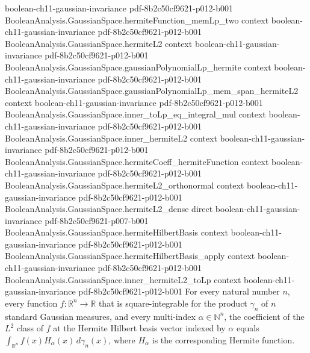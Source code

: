 \begin{lemma}
  {boolean-ch11-gaussian-invariance}
  {pdf-8b2c50cf9621-p012-b001}
\proofstep
  {BooleanAnalysis.GaussianSpace.hermiteFunction_memLp_two}
  {context}
  {boolean-ch11-gaussian-invariance}
  {pdf-8b2c50cf9621-p012-b001}
\proofstep
  {BooleanAnalysis.GaussianSpace.hermiteL2}
  {context}
  {boolean-ch11-gaussian-invariance}
  {pdf-8b2c50cf9621-p012-b001}
\proofstep
  {BooleanAnalysis.GaussianSpace.gaussianPolynomialLp_hermite}
  {context}
  {boolean-ch11-gaussian-invariance}
  {pdf-8b2c50cf9621-p012-b001}
\proofstep
  {BooleanAnalysis.GaussianSpace.gaussianPolynomialLp_mem_span_hermiteL2}
  {context}
  {boolean-ch11-gaussian-invariance}
  {pdf-8b2c50cf9621-p012-b001}
\proofstep
  {BooleanAnalysis.GaussianSpace.inner_toLp_eq_integral_mul}
  {context}
  {boolean-ch11-gaussian-invariance}
  {pdf-8b2c50cf9621-p012-b001}
\proofstep
  {BooleanAnalysis.GaussianSpace.inner_hermiteL2}
  {context}
  {boolean-ch11-gaussian-invariance}
  {pdf-8b2c50cf9621-p012-b001}
\proofstep
  {BooleanAnalysis.GaussianSpace.hermiteCoeff_hermiteFunction}
  {context}
  {boolean-ch11-gaussian-invariance}
  {pdf-8b2c50cf9621-p012-b001}
\proofstep
  {BooleanAnalysis.GaussianSpace.hermiteL2_orthonormal}
  {context}
  {boolean-ch11-gaussian-invariance}
  {pdf-8b2c50cf9621-p012-b001}
\proofstep
  {BooleanAnalysis.GaussianSpace.hermiteL2_dense}
  {direct}
  {boolean-ch11-gaussian-invariance}
  {pdf-8b2c50cf9621-p007-b001}
\proofstep
  {BooleanAnalysis.GaussianSpace.hermiteHilbertBasis}
  {context}
  {boolean-ch11-gaussian-invariance}
  {pdf-8b2c50cf9621-p012-b001}
\proofstep
  {BooleanAnalysis.GaussianSpace.hermiteHilbertBasis_apply}
  {context}
  {boolean-ch11-gaussian-invariance}
  {pdf-8b2c50cf9621-p012-b001}
\proofstep
  {BooleanAnalysis.GaussianSpace.inner_hermiteL2_toLp}
  {context}
  {boolean-ch11-gaussian-invariance}
  {pdf-8b2c50cf9621-p012-b001}
For every natural number $n$, every function $f:\mathbb R^n\to\mathbb R$ that is square-integrable for the product $\gamma_n$ of $n$ standard Gaussian measures, and every multi-index $\alpha\in\mathbb N^n$, the coefficient of the $L^2$ class of $f$ at the Hermite Hilbert basis vector indexed by $\alpha$ equals $\int_{\mathbb R^n} f(x)H_\alpha(x)\,d\gamma_n(x)$, where $H_\alpha$ is the corresponding Hermite function.
\end{lemma}

